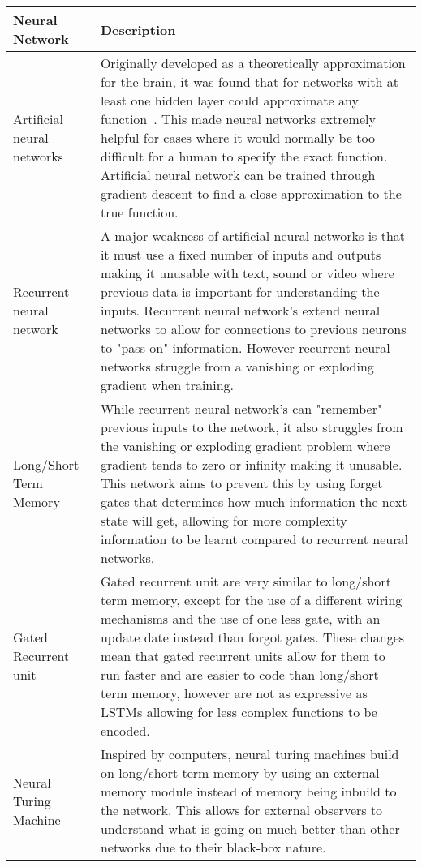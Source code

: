 \begin{longtable}{|p{3.5cm}|p{11cm}|} \hline
    \textbf{Neural Network} & \textbf{Description} \\ \hline
    Artificial neural networks~\citep{ANN} & Originally developed as a theoretically approximation for the brain, it
        was found that for networks with at least one hidden layer could approximate any
        function~\citep{csaji2001approximation}. This made neural networks extremely helpful for cases where it would
        normally be too difficult for a human to specify the exact function. Artificial neural network can be trained
        through gradient descent to find a close approximation to the true function. \\ \hline

    Recurrent neural network~\citep{RNN} & A major weakness of artificial neural networks is that it must use a fixed
        number of inputs and outputs making it unusable with text, sound or video where previous data is important
        for understanding the inputs. Recurrent neural network's extend neural networks to allow for connections to
        previous neurons to "pass on" information. However recurrent neural networks struggle from a vanishing or
        exploding gradient when training. \\ \hline

    Long/Short Term Memory~\citep{LSTM} & While recurrent neural network's can "remember" previous inputs to the
        network, it also struggles from the vanishing or exploding gradient problem where gradient tends to zero or
        infinity making it unusable. This network aims to prevent this by using forget gates that determines how much
        information the next state will get, allowing for more complexity information to be learnt compared to
        recurrent neural networks. \\ \hline

    Gated Recurrent unit~\citep{GRU} & Gated recurrent unit are very similar to long/short term memory, except for the
        use of a different wiring mechanisms and the use of one less gate, with an update date instead than forgot gates.
        These changes mean that gated recurrent units allow for them to run faster and are easier to code than
        long/short term memory, however are not as expressive as LSTMs allowing for less complex functions to be
        encoded. \\ \hline

    Neural Turing Machine~\citep{NTM} & Inspired by computers, neural turing machines build on long/short term memory
        by using an external memory module instead of memory being inbuild to the network. This allows for external
        observers to understand what is going on much better than other networks due to their black-box nature. \\ \hline


\end{longtable}
